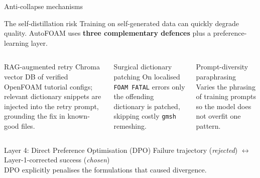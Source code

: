 \documentclass[aspectratio=169,10pt]{beamer}
\begin{document}
\begin{frame}{Anti-collapse mechanisms}
\begin{block}{The self-distillation risk}
\footnotesize Training on self-generated data can quickly degrade quality. AutoFOAM uses \textbf{three complementary defences} plus a preference-learning layer.
\end{block}
\vspace{0.15cm}
\begin{columns}[T,onlytextwidth]
\begin{exampleblock}{RAG-augmented retry}
\footnotesize Chroma vector DB of verified OpenFOAM tutorial configs; relevant dictionary snippets are injected into the retry prompt, grounding the fix in known-good files.
\end{exampleblock}
\begin{exampleblock}{Surgical dictionary patching}
\footnotesize On localised \texttt{FOAM FATAL} errors only the offending dictionary is patched, skipping costly \texttt{gmsh} remeshing.
\end{exampleblock}
\begin{exampleblock}{Prompt-diversity paraphrasing}
\footnotesize Varies the phrasing of training prompts so the model does not overfit one pattern.
\end{exampleblock}
\end{columns}
\vspace{0.2cm}
\begin{alertblock}{Layer 4: Direct Preference Optimisation (DPO)}
\centering\small
Failure trajectory (\emph{rejected}) $\longleftrightarrow$ Layer-1-corrected success (\emph{chosen})\\
DPO explicitly penalises the formulations that caused divergence.
\end{alertblock}
\end{frame}
\end{document}
